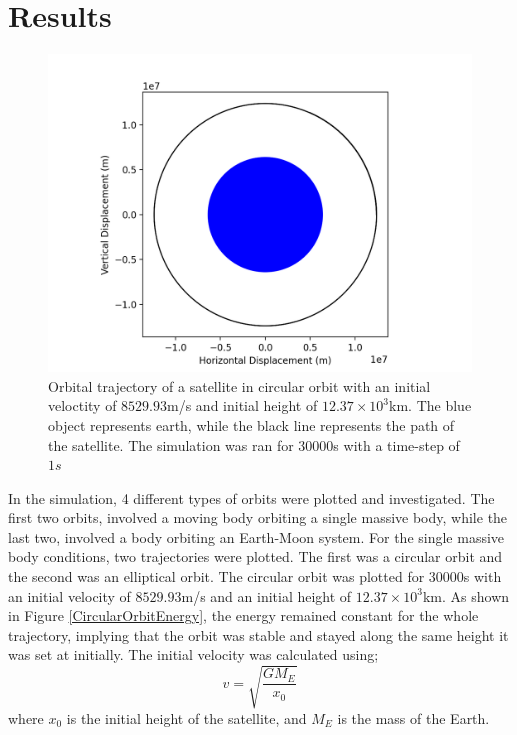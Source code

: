 \documentclass{revtex4-2}
\begin{document}
\section{Results}
\begin{figure}
    \includegraphics[width = 0.96\linewidth]{CircularOrbit2d.png}
    \caption{Orbital trajectory of a satellite in circular orbit with an initial veloctity of $8529.93$m/s and initial height of $12.37\times10^3$km. The blue object represents
        earth, while the black line represents the path of the satellite. The simulation was ran for $30000$s with a time-step of $1s$ }
    \label{CircularOrbit}
\end{figure}
In the simulation, 4 different types of orbits were plotted and investigated. The first two orbits, involved a moving body orbiting a single massive body, while the last two, involved
a body orbiting an Earth-Moon system. For the single massive body conditions, two trajectories were plotted. The first was a circular orbit and the second was an elliptical
orbit. The circular orbit was plotted for $30000$s with an initial velocity of $8529.93$m/s and an initial height of $12.37\times10^3$km. As shown in Figure \ref{CircularOrbitEnergy},
the energy remained constant for the whole trajectory, implying that the orbit was stable and stayed along the same height it was set at initially. The initial velocity
was calculated using;
\begin{equation}
    v = \sqrt{\frac{G M_E}{x_0}}
\end{equation}
where $x_0$ is the initial height of the satellite, and $M_E$ is the mass of the Earth.
\end{document}
